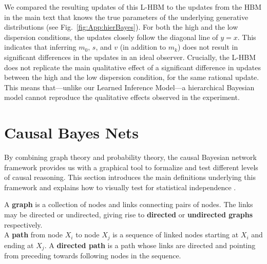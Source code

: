
We compared the resulting updates of this L-HBM to the updates from the HBM in the main text that knows the true parameters of the underlying generative distributions (see Fig.~\ref{fig:App:hierBayes}). For both the high and the low dispersion conditions, the updates closely follow the diagonal line of $y=x$. This indicates that inferring $m_0$, $s$, and $v$ (in addition to $m_k$) does not result in significant differences in the updates in an ideal observer. Crucially, the L-HBM does not replicate the main qualitative effect of a significant difference in updates between the high and the low dispersion condition, for the same rational update. This means that---unlike our Learned Inference Model---a hierarchical Bayesian model cannot reproduce the qualitative effects observed in the experiment.


\section{Causal Bayes Nets}
\label{app:causal_cbn}

By combining graph theory and probability theory, the causal Bayesian network framework provides us with a graphical tool to formalize and test different levels of causal reasoning. This section introduces the main definitions underlying this framework and explains how to visually test for statistical independence  \citep{pearl88probabilistic,bishop06pattern,kollerl09probabilistic,barber12bayesian,murphy12machine}.


A {\bf graph} is a collection of nodes and links connecting pairs of nodes.
The links may be directed or undirected, giving rise to {\bf directed} or {\bf undirected graphs} respectively.\\[5pt]
A {\bf path} from node $X_i$ to node $X_j$ is a sequence of linked nodes starting
at $X_i$ and ending at $X_j$. A {\bf directed path} is a path whose links are directed and pointing from preceding towards following nodes in the sequence.\\[5pt]


